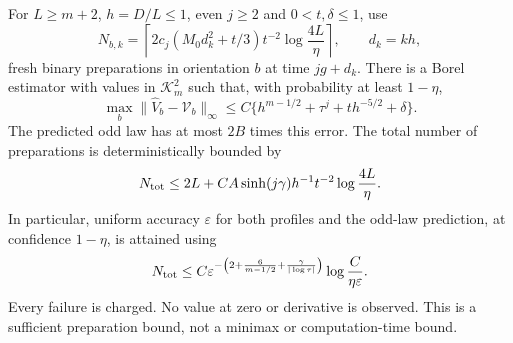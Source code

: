 \begin{theorem}
\label{thm:v12-acquisition}
For $L\ge m+2$, $h=D/L\le1$, even $j\ge2$ and
$0<t,\delta\le1$, use
\begin{equation}\label{eq:v12-allocation}
 N_{b,k}=\left\lceil
   2c_j(M_0d_k^2+t/3)t^{-2}\log\frac{4L}{\eta}\right\rceil,
 \qquad d_k=kh,
\end{equation}
fresh binary preparations in orientation $b$ at time $jg+d_k$.
There is a Borel estimator with values in $\mathcal K_m^2$ such
that, with probability at least $1-\eta$,
\begin{equation}\label{eq:v12-error}
 \max_b\|\widehat V_b-\mathcal V_b\|_\infty
     \le C\{h^{m-1/2}+\tau^j+t h^{-5/2}+\delta\}.
\end{equation}
The predicted odd law has at most $2B$ times this error. The total
number of preparations is deterministically bounded by
\begin{equation}\label{eq:v12-total}
 N_{\rm tot}\le2L+C A\sinh(j\gamma)h^{-1}t^{-2}
                                      \log\frac{4L}{\eta}.
\end{equation}
In particular, uniform accuracy $\varepsilon$ for both profiles and
the odd-law prediction, at confidence $1-\eta$, is attained using
\begin{equation}\label{eq:v12-rate}
 N_{\rm tot}\le C\varepsilon^{-\left(2+\frac6{m-1/2}
                                +\frac\gamma{|\log\tau|}\right)}
                                \log\frac{C}{\eta\varepsilon}.
\end{equation}
Every failure is charged. No value at zero or derivative is observed.
This is a sufficient preparation bound, not a minimax or
computation-time bound.
\end{theorem}
